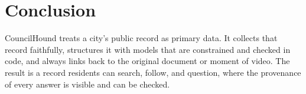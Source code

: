 \documentclass[11pt]{article}
\begin{document}
\section{Conclusion}

CouncilHound treats a city's public record as primary data. It collects that record
faithfully, structures it with models that are constrained and checked in code, and
always links back to the original document or moment of video. The result is a record
residents can search, follow, and question, where the provenance of every answer is
visible and can be checked.
\end{document}
